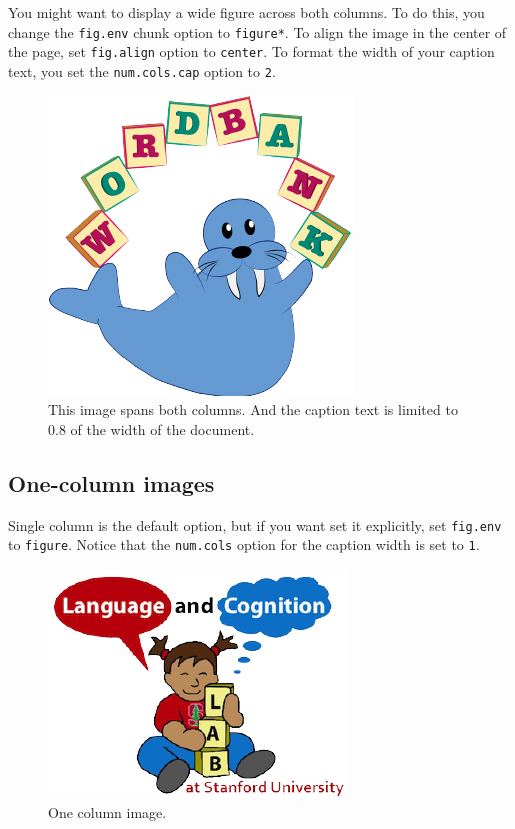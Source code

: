 \documentclass[10pt, letterpaper]{article}
\newenvironment{CodeChunk}{}{}
\begin{document}
You might want to display a wide figure across both columns. To do this,
you change the \texttt{fig.env} chunk option to \texttt{figure*}. To
align the image in the center of the page, set \texttt{fig.align} option
to \texttt{center}. To format the width of your caption text, you set
the \texttt{num.cols.cap} option to \texttt{2}.

\begin{CodeChunk}
\begin{figure}[h]

{\centering \includegraphics{figs/2-col-image-1} 

}

\caption[This image spans both columns]{This image spans both columns. And the caption text is limited to 0.8 of the width of the document.}\label{fig:2-col-image}
\end{figure}
\end{CodeChunk}

\subsection{One-column images}\label{one-column-images}

Single column is the default option, but if you want set it explicitly,
set \texttt{fig.env} to \texttt{figure}. Notice that the
\texttt{num.cols} option for the caption width is set to \texttt{1}.

\begin{CodeChunk}
\begin{figure}[H]

{\centering \includegraphics{figs/image-1} 

}

\caption[One column image]{One column image.}\label{fig:image}
\end{figure}
\end{CodeChunk}
\end{document}
